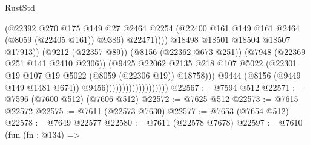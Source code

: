 \begin{lexlean}{RustStd}
\begin{coremodule}
                                                      (@22392
                                                        @270
                                                        @175
                                                        @149
                                                        @27
                                                        @2464
                                                        @2254
                                                        (@22400
                                                          @161
                                                          @149
                                                          @161
                                                          @2464
                                                          (@8059 (@22405 @161))
                                                          @9386)
                                                        @22471))))
                                                @18498
                                                @18501
                                                @18504
                                                @18507
                                                @17913))
                                            (@9212 (@22357 @89))
                                            (@8156 (@22362 @673 @251))
                                            (@7948 (@22369 @251 @141 @2410 @2306))
                                            (@9425
                                              @22062
                                              @2135
                                              @218
                                              @107
                                              @5022
                                              (@22301
                                                @19
                                                @107
                                                @19
                                                @5022
                                                (@8059 (@22306 @19))
                                                @18758)))
                                          @9444
                                          (@8156 (@9449 @149 @1481 @674))
                                          @9456)))))))))))))))))))
@22567 := @7594 @512
@22571 := @7596 (@7600 @512) (@7606 @512)
@22572 := @7625 @512
@22573 := @7615 @22572
@22575 := @7611 (@22573 @7630)
@22577 := @7653 (@7654 @512)
@22578 := @7649 @22577
@22580 := @7611 (@22578 @7678)
@22597 := @7610
    (fun (fn : @134) =>

\end{coremodule}
\end{lexlean}
